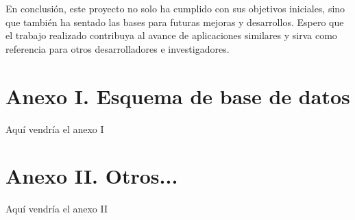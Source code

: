 \documentclass[draft]{scrbook}
\begin{document}
En conclusión, este proyecto no solo ha cumplido con sus objetivos iniciales, sino que también ha sentado las bases para futuras mejoras y desarrollos. Espero que el trabajo realizado contribuya al avance de aplicaciones similares y sirva como referencia para otros desarrolladores e investigadores.




\newpage
\printbibliography

%
%


\appendix
\chapter{Anexo I. Esquema de base de datos}
Aquí vendría el anexo I 

\chapter{Anexo II. Otros...}
Aquí vendría el anexo II 


\printnoidxglossary[type=\acronymtype,title=Glosario]
\end{document}
